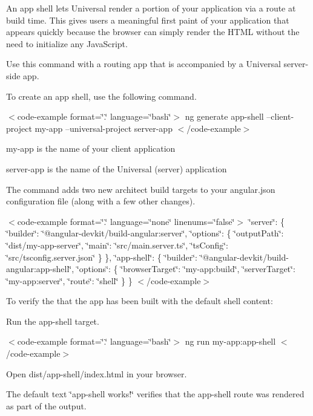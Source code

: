 An app shell lets Universal render a portion of your application via a route at build time. This gives users a meaningful first paint of your application that appears quickly because the browser can simply render the HTML without the need to initialize any Java\+Script.

Use this command with a routing app that is accompanied by a Universal server-\/side app.

To create an app shell, use the following command.

$<$code-\/example format=\char`\"{}.\char`\"{} language=\char`\"{}bash\char`\"{}$>$ ng generate app-\/shell --client-\/project my-\/app --universal-\/project server-\/app $<$/code-\/example$>$


\begin{DoxyItemize}
\item {\ttfamily my-\/app} is the name of your client application
\item {\ttfamily server-\/app} is the name of the Universal (server) application
\end{DoxyItemize}

The command adds two new architect build targets to your {\ttfamily angular.\+json} configuration file (along with a few other changes).

$<$code-\/example format=\char`\"{}.\char`\"{} language=\char`\"{}none\char`\"{} linenums=\char`\"{}false\char`\"{}$>$ \char`\"{}server\char`\"{}\+: \{ \char`\"{}builder\char`\"{}\+: \char`\"{}@angular-\/devkit/build-\/angular\+:server\char`\"{}, \char`\"{}options\char`\"{}\+: \{ \char`\"{}output\+Path\char`\"{}\+: \char`\"{}dist/my-\/app-\/server\char`\"{}, \char`\"{}main\char`\"{}\+: \char`\"{}src/main.\+server.\+ts\char`\"{}, \char`\"{}ts\+Config\char`\"{}\+: \char`\"{}src/tsconfig.\+server.\+json\char`\"{} \} \}, \char`\"{}app-\/shell\char`\"{}\+: \{ \char`\"{}builder\char`\"{}\+: \char`\"{}@angular-\/devkit/build-\/angular\+:app-\/shell\char`\"{}, \char`\"{}options\char`\"{}\+: \{ \char`\"{}browser\+Target\char`\"{}\+: \char`\"{}my-\/app\+:build\char`\"{}, \char`\"{}server\+Target\char`\"{}\+: \char`\"{}my-\/app\+:server\char`\"{}, \char`\"{}route\char`\"{}\+: \char`\"{}shell\char`\"{} \} \} $<$/code-\/example$>$

To verify the that the app has been built with the default shell content\+:


\begin{DoxyEnumerate}
\item Run the app-\/shell target.

$<$code-\/example format=\char`\"{}.\char`\"{} language=\char`\"{}bash\char`\"{}$>$ ng run my-\/app\+:app-\/shell $<$/code-\/example$>$
\end{DoxyEnumerate}
\begin{DoxyEnumerate}
\item Open {\ttfamily dist/app-\/shell/index.\+html} in your browser.
\end{DoxyEnumerate}

The default text \char`\"{}app-\/shell works!\char`\"{} verifies that the app-\/shell route was rendered as part of the output. 